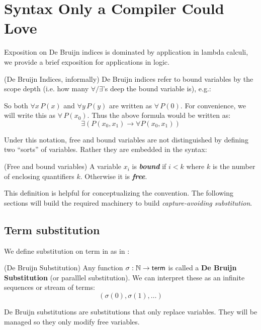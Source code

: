 \section{Syntax Only a Compiler Could Love}
Exposition on De Bruijn indices is dominated by application in lambda calculi, we provide a brief exposition for applications in logic.
\begin{cthremark}{(De Bruijn Indices, informally)}
De Bruijn indices refer to bound variables by the scope depth (i.e. how many \(\forall/\exists\)'s deep the bound variable is), e.g.:



So both \(\forall x\,P(x)\) and \(\forall y\,P(y)\) are written as \(\forall\,P(0)\). For convenience, we will write this as \(\forall\,P(x_0)\). Thus the above formula would be written as:
\[ \exists \left( P(x_0,x_1) \to \forall P(x_0,x_1) \right) \]
\end{cthremark}
Under this notation, free and bound variables are not distinguished by defining two ``sorts'' of variables. Rather they are embedded in the syntax:
\begin{cthdefinition}{(Free and bound variables)}
  A variable $x_i$ is \textbf{\emph{bound}} if $i < k$ where $k$ is the number of enclosing quantifiers $k$. Otherwise it is \textbf{\emph{free}}.
\end{cthdefinition}
This definition is helpful for conceptualizing the convention. The following sections will build the required machinery to build \emph{capture-avoiding substitution}.

\subsection{Term substitution}

We define substitution on term in as in \cite{STA19,STA20}:

\begin{cthdefinition}{(De Bruijn Substitution)}
  Any function $\sigma: \mathbb{N} \to \textsf{term}$ is called a \textbf{De Bruijn Substitution} (or paralllel substitution). We can interpret these as an infinite sequences or stream of terms:
  \[ (\sigma(0), \sigma(1), \dots) \]
\end{cthdefinition}

De Bruijn substitutions are substitutions that only replace variables. They will be managed so they only modify free variables.

